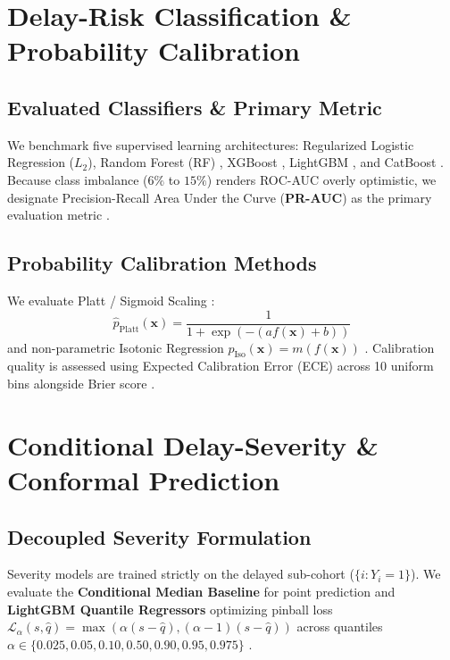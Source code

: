 \documentclass[11pt,a4paper]{article}
\begin{document}
\section{Delay-Risk Classification \& Probability Calibration}
\subsection{Evaluated Classifiers \& Primary Metric}
We benchmark five supervised learning architectures: Regularized Logistic Regression ($L_2$), Random Forest (RF) \cite{breiman2001random}, XGBoost \cite{chen2016xgboost}, LightGBM \cite{ke2017lightgbm}, and CatBoost \cite{prokhorenkova2018catboost}. Because class imbalance ($6\%$ to $15\%$) renders ROC-AUC overly optimistic, we designate Precision-Recall Area Under the Curve (\textbf{PR-AUC}) as the primary evaluation metric \cite{niculescu2005predicting}.

\subsection{Probability Calibration Methods}
We evaluate Platt / Sigmoid Scaling \cite{platt1999probabilistic}:
\begin{equation}
\hat{p}_{\text{Platt}}(\mathbf{x}) = \frac{1}{1 + \exp\left(-(a f(\mathbf{x}) + b)\right)}
\end{equation}
and non-parametric Isotonic Regression $\hat{p}_{\text{Iso}}(\mathbf{x}) = m(f(\mathbf{x}))$ \cite{zadrozny2002transforming}. Calibration quality is assessed using Expected Calibration Error (ECE) across 10 uniform bins alongside Brier score \cite{brier1950verification, guo2017calibration}.

\section{Conditional Delay-Severity \& Conformal Prediction}
\subsection{Decoupled Severity Formulation}
Severity models are trained strictly on the delayed sub-cohort ($\{i : Y_i = 1\}$). We evaluate the \textbf{Conditional Median Baseline} for point prediction and \textbf{LightGBM Quantile Regressors} optimizing pinball loss $\mathcal{L}_\alpha(s, \hat{q}) = \max\left(\alpha (s - \hat{q}), (\alpha - 1)(s - \hat{q})\right)$ across quantiles $\alpha \in \{0.025, 0.05, 0.10, 0.50, 0.90, 0.95, 0.975\}$ \cite{koenker1978regression}.
\end{document}
